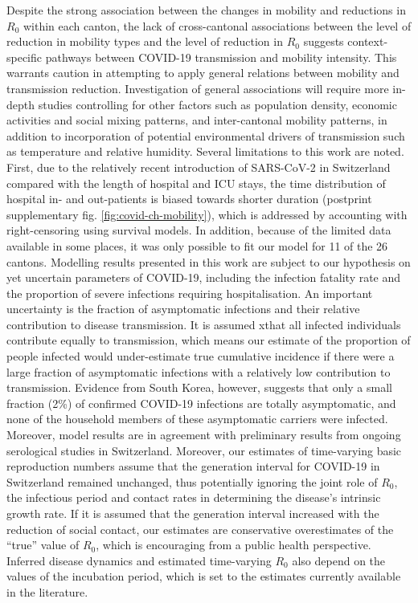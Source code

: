   Despite the strong association between the changes in mobility and reductions in $R_0$ within each canton, the lack of cross-cantonal associations between the level of reduction in mobility types and the level of reduction in $R_0$ suggests context-specific pathways between COVID-19 transmission and mobility intensity. This warrants caution in attempting to apply general relations between mobility and transmission reduction. Investigation of general associations will require more in-depth studies controlling for other factors such as population density, economic activities and social mixing patterns, and inter-cantonal mobility patterns, in addition to incorporation of potential environmental drivers of transmission such as temperature and relative humidity\cite{Neher:PotentialImpactSeasonal:2020, Kissler:ProjectingTransmissionDynamics:2020}. Several limitations to this work are noted. First, due to the relatively recent introduction of SARS-CoV-2 in Switzerland compared with the length of hospital and ICU stays, the time distribution of hospital in- and out-patients is biased towards shorter duration (postprint supplementary fig. \ref{fig:covid-ch-mobility}), which is addressed by accounting with right-censoring using survival models. In addition, because of the limited data available in some places, it was only possible to fit our model for 11 of the 26 cantons. Modelling results presented in this work are subject to our hypothesis on yet uncertain parameters of COVID-19, including the infection fatality rate and the proportion of severe infections requiring hospitalisation. An important uncertainty is the fraction of asymptomatic infections and their relative contribution to disease transmission. It is assumed xthat all infected individuals contribute equally to transmission, which means our estimate of the proportion of people infected would under-estimate true cumulative incidence if there were a large fraction of asymptomatic infections with a relatively low contribution to transmission. Evidence from South Korea, however, suggests that only a small fraction (2\%) of confirmed COVID-19 infections are totally asymptomatic, and none of the household members of these asymptomatic carriers were infected\cite{Park:EarlyReleaseCoronavirus:2020}. Moreover, model results are in agreement with preliminary results from ongoing serological studies in Switzerland\cite{Stringhini:RepeatedSeroprevalenceAntiSARSCoV2:2020}. Moreover, our estimates of time-varying basic reproduction numbers assume that the generation interval for COVID-19 in Switzerland remained unchanged, thus potentially ignoring the joint role of $R_0$, the infectious period and contact rates in determining the disease’s intrinsic growth rate\cite{Yan:SeparateRolesLatent:2008}. If it is assumed that the generation interval increased with the reduction of social contact, our estimates are conservative overestimates of the “true” value of $R_0$, which is encouraging from a public health perspective. Inferred disease dynamics and estimated time-varying $R_0$ also depend on the values of the incubation period, which is set to the estimates currently available in the literature. 
